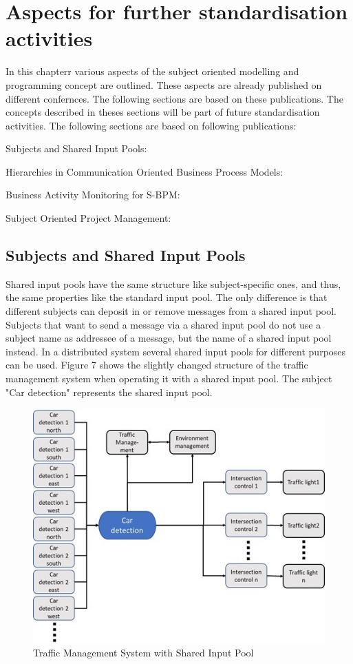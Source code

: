 \chapter{Aspects for further standardisation activities}
In this chapterr various aspects of the subject oriented modelling and programming concept are outlined. These aspects are already published on different confernces. The following sections are based on these publications.
The concepts described in theses sections will be part of future standardisation activities.
The following sections are based on following publications:\\
\begin{list}{-}{spacing}
	\item Subjects and Shared Input Pools:
	\item Hierarchies in Communication Oriented Business Process Models:
	\item Business Activity Monitoring for S-BPM:
	\item Subject Oriented Project Management:
\end{list}

\section{Subjects and Shared Input Pools}

Shared input pools have the same structure like subject-specific ones, and thus, the same properties like the standard input pool. The only difference is that different subjects can deposit in or remove messages from a shared input pool. Subjects that want to send a message via a shared input pool do not use a subject name as addressee of a message, but the name of a shared input pool instead. In a distributed system several shared input pools for different purposes can be used. Figure 7 shows the slightly changed structure of the traffic management system when operating it with a shared input pool. The subject "Car detection" represents the shared input pool.


\begin{figure}
	\centering
	\includegraphics[width=0.7\linewidth]{Figures/Chapter5/figuresshared/SharedInputPoolExample.jpg}
	\caption[Traffic Management System with Shared Input Pool]{Traffic Management System with Shared Input Pool}
	\label{fig:SharedInputPooTraffic}
\end{figure}


